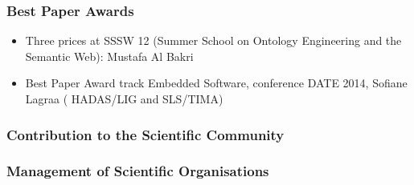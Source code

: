 \subsubsection*{Best Paper Awards}
\begin{itemize}

\item Three prices at SSSW 12 (Summer School on Ontology Engineering and the Semantic Web): Mustafa Al Bakri  

\item Best Paper Award track Embedded Software, conference DATE 2014, Sofiane Lagraa ( HADAS/LIG and SLS/TIMA) 

\end{itemize}




\subsubsection{Contribution to the Scientific Community}

\subsubsection*{Management of Scientific Organisations}

